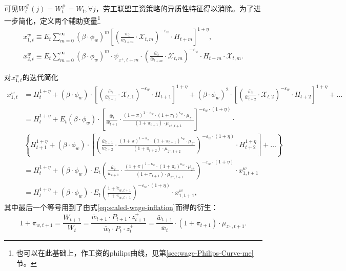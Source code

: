可见$W_t^{\#}(j) = W_t^{\#} = W_t,\forall j$，劳工联盟工资策略的异质性特征得以消除。为了进一步简化，定义两个辅助变量\footnote{也可以在此基础上，作工资的philips曲线，见第\ref{sec:wage-Philips-Curve-me}节。}
\begin{align}
  \label{eq:union-auxiliary-xw1}
  x_{1,t}^{w}\equiv   E_t \sum_{m=0}^{\infty} \left(\beta \cdot \phi_w\right)^m  \left[
\left( \frac{\bar{w}_t}{\bar{w}_{t+m}} \cdot \mathcal{X}_{t,m} \right)^{-\varepsilon_w} \cdot H_{t+m} \right]^{1+\eta}, \\
  \label{eq:union-auxiliary-xw2}
    x_{2,t}^{w}\equiv     E_t \sum_{m=0}^{\infty} \left(\beta \cdot \phi_w\right)^m  \cdot \psi_{z^+,t+m} \cdot \left( \frac{\bar{w}_t}{\bar{w}_{t+m}} \cdot \mathcal{X}_{t,m} \right)^{-\varepsilon_w} \cdot H_{t+m} \cdot \mathcal{X}_{t,m}.
\end{align}

对$x_{1,t}^{w}$的迭代简化
\begin{align}
\label{eq:union-auxiliary-xw1-iter}
  x_{1,t}^{w} &= H_t^{1+\eta} + \left(\beta \cdot \phi_w\right) \cdot \left[\left(\frac{\bar{w}_t}{\bar{w}_{t+1}} \cdot \mathcal{X}_{t,1}\right)^{-\varepsilon_w} \cdot H_{t+1}\right]^{1+\eta} + \left(\beta \cdot \phi_w\right)^2 \cdot \left[\left(\frac{\bar{w}_t}{\bar{w}_{t+2}} \cdot \mathcal{X}_{t,2}\right)^{-\varepsilon_w} \cdot H_{t+2}\right]^{1+\eta} + \ldots \nonumber \\
              &= H_t^{1+\eta} + E_t \left(\beta \cdot \phi_w\right) \cdot \left[\frac{\bar{w}_{t}}{\bar{w}_{t+1}} \cdot \frac{(1+\pi)^{1-\kappa_w} \cdot (1+\pi_t)^{\kappa_w} \cdot \mu_{z^+}}{(1+\pi_{t+1}) \cdot \mu_{z^+,t+1}}\right]^{-\varepsilon_w \cdot (1+\eta)} \cdot \nonumber \\
              & \left\{
  H_{t+1}^{1+\eta} + \left(\beta \cdot \phi_w\right) \cdot
  \left[
  \left(
  \frac{\bar{w}_{t+1}}{\bar{w}_{t+2}} \cdot
  \frac{(1+\pi)^{1-\kappa_w} \cdot (1+\pi_{t+1})^{\kappa_w} \cdot \mu_{z^+}}{(1+\pi_{t+2}) \cdot \mu_{z^+,t+2}}
  \right)^{-\varepsilon_w \cdot (1+\eta)} \cdot H_{t+2}^{1+\eta}
  \right] + \ldots
  \right\} \nonumber \\
              &=H_t^{1+\eta} + (\beta \cdot \phi_w) \cdot E_t \left(
                \frac{\bar{w}_{t}}{\bar{w}_{t+1}} \cdot
                \frac{(1+\pi)^{1-\kappa_w} \cdot (1+\pi_{t})^{\kappa_w} \cdot \mu_{z^+}}{(1+\pi_{t+1}) \cdot \mu_{z^+,t+1}}
                \right)^{-\varepsilon_w \cdot (1+\eta)} \cdot x_{1,t+1}^{w}\nonumber \\
              &=H_t^{1+\eta} + (\beta \cdot \phi_w) \cdot E_t \left(\frac{
  1+\tilde{\pi}_{w,t+1}
                }{
                1+\pi_{w,t+1}
                }\right)^{-\varepsilon_w \cdot (1+\eta)} \cdot x_{1,t+1}^{w},
\end{align}
其中最后一个等号用到了由式\eqref{eq:scaled-wage-inflation}而得的衍生：
\begin{equation}
  \label{eq:inflation-w-tplus-in-pi}
  1+\pi_{w,t+1} = \frac{W_{t+1}}{W_{t}} = \frac{\bar{w}_{t+1} \cdot P_{t+1} \cdot z_{t+1}^+}{\bar{w}_{t} \cdot P_{t} \cdot z_{t}^+} = \frac{\bar{w}_{t+1}}{\bar{w}_{t}} \cdot \left(1+\pi_{t+1}\right) \cdot \mu_{z^+,t+1}.
\end{equation}


